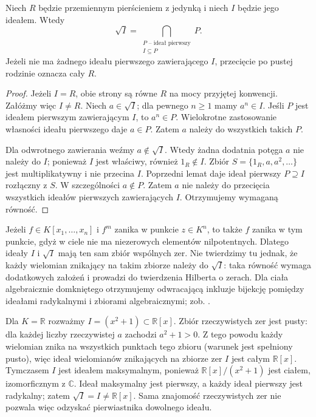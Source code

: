 \begin{twierdzenie}
\label{aa:tw:radical-intersection-primes}
Niech $R$ będzie przemiennym pierścieniem z jedynką
i niech $I$ będzie jego ideałem. Wtedy
\[
 \sqrt I=\bigcap_{\substack{P\text{ -- ideał pierwszy}\\ I\subseteq P}}P.
\]
Jeżeli nie ma żadnego ideału pierwszego zawierającego
$I$, przecięcie po pustej rodzinie oznacza cały $R$.
\end{twierdzenie}
\begin{proof}
Jeżeli $I=R$, obie strony są równe $R$ na mocy
przyjętej konwencji. Załóżmy więc $I\ne R$.
Niech $a\in\sqrt I$; dla pewnego $n\ge1$ mamy
$a^n\in I$. Jeśli $P$ jest ideałem pierwszym zawierającym
$I$, to $a^n\in P$. Wielokrotne zastosowanie własności
ideału pierwszego daje $a\in P$. Zatem $a$ należy
do wszystkich takich $P$.

Dla odwrotnego zawierania weźmy $a\notin\sqrt I$.
Wtedy żadna dodatnia potęga $a$ nie należy do $I$;
ponieważ $I$ jest właściwy, również $1_R\notin I$.
Zbiór $S=\{1_R,a,a^2,\ldots\}$ jest multiplikatywny
i nie przecina $I$. Poprzedni lemat daje ideał
pierwszy $P\supseteq I$ rozłączny z $S$.
W szczególności $a\notin P$. Zatem $a$ nie należy
do przecięcia wszystkich ideałów pierwszych zawierających
$I$. Otrzymujemy wymaganą równość.
\end{proof}

\begin{uwaga}
\label{aa:uw:radical-geometry}
Jeżeli $f\in K[x_1,\ldots,x_n]$ i $f^m$ zanika
w punkcie $z\in K^n$, to także $f$ zanika w tym punkcie,
gdyż w ciele nie ma niezerowych elementów nilpotentnych.
Dlatego ideały $I$ i $\sqrt I$ mają ten sam zbiór
wspólnych zer. Nie twierdzimy tu jednak, że każdy
wielomian znikający na takim zbiorze należy do $\sqrt I$:
taka równość wymaga dodatkowych założeń i prowadzi
do twierdzenia Hilberta o zerach. Dla ciała algebraicznie domkniętego otrzymujemy odwracającą inkluzje bijekcję pomiędzy ideałami radykalnymi i zbiorami algebraicznymi; zob. .
\end{uwaga}

\begin{przyklad}
\label{aa:prz:real-zero-set-not-radical}
Dla $K=\mathbb R$ rozważmy $I=(x^2+1)\subset\mathbb R[x]$.
Zbiór rzeczywistych zer jest pusty: dla każdej
liczby rzeczywistej $a$ zachodzi $a^2+1>0$.
Z tego powodu każdy wielomian znika na wszystkich
punktach tego zbioru (warunek jest spełniony
pusto), więc ideał wielomianów znikających na zbiorze
zer $I$ jest całym $\mathbb R[x]$.
Tymczasem $I$ jest ideałem maksymalnym,
ponieważ $\mathbb R[x]/(x^2+1)$ jest ciałem,
izomorficznym z $\mathbb C$. Ideał maksymalny
jest pierwszy, a każdy ideał pierwszy jest radykalny;
zatem $\sqrt I=I\ne\mathbb R[x]$.
Sama znajomość rzeczywistych zer nie pozwala więc
odzyskać pierwiastnika dowolnego ideału.
\end{przyklad}


